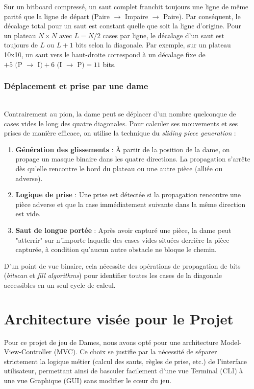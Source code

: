 \documentclass[11pt,a4paper]{article}
\begin{document}
Sur un bitboard compressé, un saut complet franchit toujours une ligne de même parité que la ligne de départ (Paire $\to$ Impaire $\to$ Paire). Par conséquent, le décalage total pour un saut est constant quelle que soit la ligne d'origine. Pour un plateau $N \times N$ avec $L = N/2$ cases par ligne, le décalage d'un saut est toujours de $L$ ou $L+1$ bits selon la diagonale. Par exemple, sur un plateau 10x10, un saut vers le haut-droite correspond à un décalage fixe de $+5 \text{ (P } \to \text{ I)} + 6 \text{ (I } \to \text{ P)} = 11$ bits.

\subsubsection{Déplacement et prise par une dame} \hfill \\
Contrairement au pion, la dame peut se déplacer d'un nombre quelconque de cases vides le long des quatre diagonales. Pour calculer ses mouvements et ses prises de manière efficace, on utilise la technique du \textit{sliding piece generation} :

\begin{enumerate}
    \item \textbf{Génération des glissements} : À partir de la position de la dame, on propage un masque binaire dans les quatre directions. La propagation s'arrête dès qu'elle rencontre le bord du plateau ou une autre pièce (alliée ou adverse).
    \item \textbf{Logique de prise} : Une prise est détectée si la propagation rencontre une pièce adverse et que la case immédiatement suivante dans la même direction est vide. 
    \item \textbf{Saut de longue portée} : Après avoir capturé une pièce, la dame peut "atterrir" sur n'importe laquelle des cases vides situées derrière la pièce capturée, à condition qu'aucun autre obstacle ne bloque le chemin.
\end{enumerate}

D'un point de vue binaire, cela nécessite des opérations de propagation de bits (\textit{bitscan} et \textit{fill algorithms}) pour identifier toutes les cases de la diagonale accessibles en un seul cycle de calcul.

\section{Architecture visée pour le Projet}

Pour ce projet de jeu de Dames, nous avons opté pour une architecture Model-View-Controller (MVC). Ce choix se justifie par la nécessité de séparer strictement la logique métier (calcul des sauts, règles de prise, etc.) de l'interface utilisateur, permettant ainsi de basculer facilement d'une vue Terminal (CLI) à une vue Graphique (GUI) sans modifier le cœur du jeu.
\end{document}
